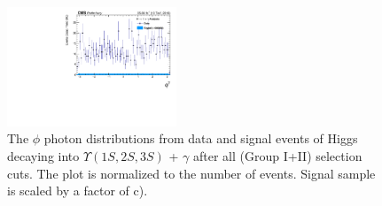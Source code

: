 \begin{figure}[!htbp]
\begin{center}
\includegraphics[width=0.45\textwidth]{figures_and_tables/outputPlots/HtoUpsilon_Cat0_ZZZZZ/nEvts/data_x_mc/withKinCuts/h_withKin_Photon_phi}\hspace*{1.cm}
\end{center}\vspace*{-.5cm}
\caption{The $\phi$ photon distributions from data and signal events of Higgs decaying into $\Upsilon(1S,2S,3S)$ + $\gamma$ after all (Group I+II) selection cuts. The plot is normalized to the number of events. Signal sample is scaled by a factor of c).}
\label{fig:phiPhoton_HtoUpsilon_Cat0_groupI_plus_II}
\end{figure}

